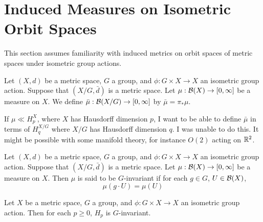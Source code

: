 \documentclass{book}
\begin{document}
	
	
	
	
	
	
	
	
	
	
	
	
	
	
	
		
	\newpage
	\section{Induced Measures on Isometric Orbit Spaces}
	
	\begin{note}
	This section assumes familiarity with induced metrics on orbit spaces of metric spaces under isometric group actions. 
	\end{note}
	
	\begin{note}
	
	\end{note}
	
	\begin{defn}
	Let $(X, d)$ be a metric space, $G$ a group, and $\phi: G \times X \rightarrow X$ an isometric group action. Suppose that $(X/G, \bar{d})$ is a metric space. Let $\mu: \mathcal{B}(X) \rightarrow [0, \infty]$ be a measure on $X$. We define $\bar{\mu}: \mathcal{B}(X/G) \rightarrow [0, \infty]$ by $\bar{\mu} = \pi_* \mu$. 
	\end{defn}
	
	\begin{note}
	If $\mu \ll H_p^X$, where $X$ has Hausdorff dimension $p$, I want to be able to define $\bar{\mu}$ in terms of $H_q^{X/G}$ where $X/G$ has Hausdorff dimension $q$. I was unable to do this. It might be possible with some manifold theory, for instance $O(2)$ acting on $\mathbb{R}^2$.
	\end{note}
	
	\begin{defn}
	Let $(X, d)$ be a metric space, $G$ a group, and $\phi: G \times X \rightarrow X$ an isometric group action. Suppose that $(X/G, \bar{d})$ is a metric space. Let $\mu: \mathcal{B}(X) \rightarrow [0, \infty]$ be a measure on $X$. Then $\mu$ is said to be $G$-invariant if for each $g \in G$, $U \in \mathcal{B}(X)$, 
	\begin{equation*}
	\mu(g \cdot U) = \mu(U)
	\end{equation*}
	\end{defn}
	
	\begin{ex}
	Let $X$ be a metric space, $G$ a group, and $\phi: G \times X \rightarrow X$ an isometric group action. Then for each $p \geq 0$, $H_p$ is $G$-invariant. 
	\end{ex}	
	
\end{document}

